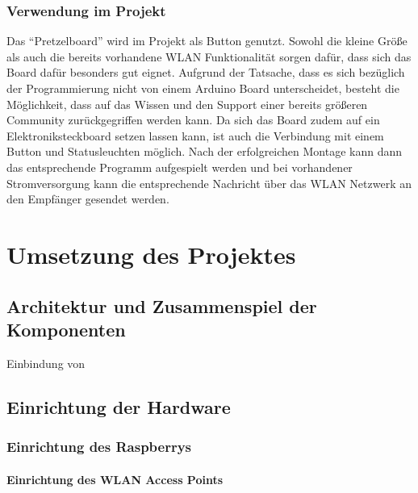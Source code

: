 \documentclass[ngerman]{scrartcl} %
\begin{document}
\subsubsection{Verwendung im Projekt}        
\label{sec:Verwendung des ``Pretzelboard''} 
Das ``Pretzelboard'' wird im Projekt als Button genutzt. Sowohl die kleine Größe als auch die bereits vorhandene WLAN Funktionalität sorgen dafür, dass sich das Board dafür besonders gut eignet. Aufgrund der Tatsache, dass es sich bezüglich der Programmierung nicht von einem Arduino Board unterscheidet, besteht die Möglichkeit, dass auf das Wissen und den Support einer bereits größeren Community zurückgegriffen werden kann. 
Da sich das Board zudem auf ein Elektroniksteckboard setzen lassen kann, ist auch die Verbindung mit einem Button und Statusleuchten möglich. Nach der erfolgreichen Montage kann dann das entsprechende Programm aufgespielt werden und bei vorhandener Stromversorgung kann die entsprechende Nachricht über das WLAN Netzwerk an den Empfänger gesendet werden. 

\newpage

\section{Umsetzung des Projektes}        
\label{sec:Umsetzung des Projektes-1}  

\subsection{Architektur und Zusammenspiel der Komponenten}        
\label{sec:Architektur und Zusammenspiel der Komponenten-1} 

Einbindung von 

\subsection{Einrichtung der Hardware}  
\label{sec:Einrichtung der Hardware-1} 

\subsubsection{Einrichtung des Raspberrys}  
\label{sec:Einrichtung des Raspberrys-1}

\paragraph{Einrichtung des WLAN Access Points}  
\label{sec:Einrichtung des WLAN Access Points-1} 
\end{document}
